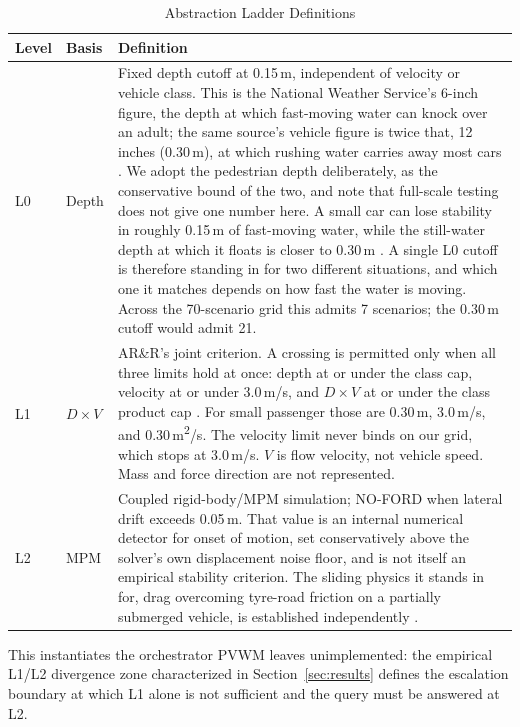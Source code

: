 \documentclass[conference]{IEEEtran}
\begin{document}
\begin{table}[t]
\caption{Abstraction Ladder Definitions}
\label{tab:ladder}
\centering
\begin{tabular}{@{}p{0.3in}p{0.55in}p{2.25in}@{}}
\toprule
\textbf{Level} & \textbf{Basis} & \textbf{Definition} \\
\midrule
L0 & Depth & Fixed depth cutoff at 0.15\,m, independent of velocity or vehicle class. This is the National Weather Service's 6-inch figure, the depth at which fast-moving water can knock over an adult; the same source's vehicle figure is twice that, 12 inches (0.30\,m), at which rushing water carries away most cars \cite{nws_tadd}. We adopt the pedestrian depth deliberately, as the conservative bound of the two, and note that full-scale testing does not give one number here. A small car can lose stability in roughly 0.15\,m of fast-moving water, while the still-water depth at which it floats is closer to 0.30\,m \cite{smithmodrafelder2019}. A single L0 cutoff is therefore standing in for two different situations, and which one it matches depends on how fast the water is moving. Across the 70-scenario grid this admits 7 scenarios; the 0.30\,m cutoff would admit 21. \\
L1 & $D\times V$ & AR\&R's joint criterion. A crossing is permitted only when all three limits hold at once: depth at or under the class cap, velocity at or under 3.0\,m/s, and $D \times V$ at or under the class product cap \cite{shand2011arr}. For small passenger those are 0.30\,m, 3.0\,m/s, and 0.30\,m\textsuperscript{2}/s. The velocity limit never binds on our grid, which stops at 3.0\,m/s. $V$ is flow velocity, not vehicle speed. Mass and force direction are not represented. \\
L2 & MPM & Coupled rigid-body/MPM simulation; NO-FORD when lateral drift exceeds 0.05\,m. That value is an internal numerical detector for onset of motion, set conservatively above the solver's own displacement noise floor, and is not itself an empirical stability criterion. The sliding physics it stands in for, drag overcoming tyre-road friction on a partially submerged vehicle, is established independently \cite{shah2018,xia2014}. \\
\bottomrule
\end{tabular}
\end{table}

This instantiates the orchestrator PVWM leaves unimplemented: the empirical L1/L2 divergence zone characterized in Section~\ref{sec:results} defines the escalation boundary at which L1 alone is not sufficient and the query must be answered at L2.
\end{document}
